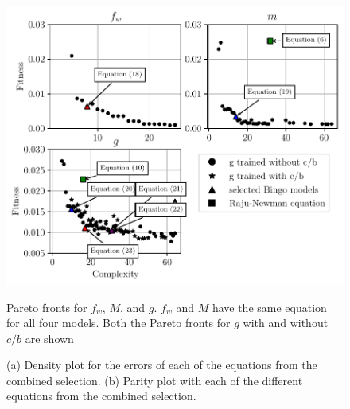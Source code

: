 \begin{figure}
    \centering
    \includegraphics[width=\textwidth]{Figures_pdf/Pareto_fronts.pdf}
    \label{fig:perato_front}
    \caption{Pareto fronts for $f_w$, $M$, and $g$. $f_w$ and $M$ have the same equation for all four models. Both the Pareto fronts for $g$ with and without $c/b$ are shown} 
\end{figure}

\begin{figure}%
    \centering
    \qquad
    \caption{(a) Density plot for the errors of each of the equations from the combined selection. (b) Parity plot with each of the different equations from the combined selection.}%
    \label{fig:combo_error_plots}%
\end{figure}


